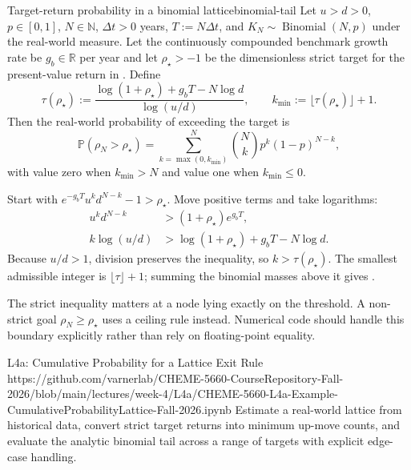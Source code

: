 \documentclass[11pt]{article}
\newcommand{\Pmeasure}{\mathbb{P}}
\begin{document}
\begin{theorem}{Target-return probability in a binomial lattice}{binomial-tail}
Let $u>d>0$, $p\in[0,1]$, $N\in\mathbb{N}$, $\Delta t>0$ years, $T:=N\Delta t$, and $K_N\sim\operatorname{Binomial}(N,p)$ under the real-world measure. Let the continuously compounded benchmark growth rate be $g_b\in\mathbb{R}$ per year and let $\rho_\star>-1$ be the dimensionless strict target for the present-value return in . Define
\begin{equation}
  \label{eq:count-threshold}
  \tau(\rho_\star):=
  \frac{\log(1+\rho_\star)+g_bT-N\log d}{\log(u/d)},
  \qquad
  k_{\min}:=\lfloor\tau(\rho_\star)\rfloor+1.
\end{equation}
Then the real-world probability of exceeding the target is
\begin{equation}
  \label{eq:binomial-tail}
  \Pmeasure(\rho_N>\rho_\star)
  =\sum_{k=\max(0,k_{\min})}^{N}
  \binom{N}{k}p^k(1-p)^{N-k},
\end{equation}
with value zero when $k_{\min}>N$ and value one when $k_{\min}\leq0$.
\end{theorem}

\begin{derivation}
Start with $e^{-g_bT}u^kd^{N-k}-1>\rho_\star$. Move positive terms and take logarithms:
\begin{align*}
  u^kd^{N-k}&>(1+\rho_\star)e^{g_bT},\\
  k\log(u/d)&>\log(1+\rho_\star)+g_bT-N\log d.
\end{align*}
Because $u/d>1$, division preserves the inequality, so $k>\tau(\rho_\star)$. The smallest admissible integer is $\lfloor\tau\rfloor+1$; summing the binomial masses above it gives .
\end{derivation}

The strict inequality matters at a node lying exactly on the threshold. A non-strict goal $\rho_N\geq\rho_\star$ uses a ceiling rule instead. Numerical code should handle this boundary explicitly rather than rely on floating-point equality.

\notebooklink
  {L4a: Cumulative Probability for a Lattice Exit Rule}
  {https://github.com/varnerlab/CHEME-5660-CourseRepository-Fall-2026/blob/main/lectures/week-4/L4a/CHEME-5660-L4a-Example-CumulativeProbabilityLattice-Fall-2026.ipynb}
  {Estimate a real-world lattice from historical data, convert strict target returns into minimum up-move counts, and evaluate the analytic binomial tail across a range of targets with explicit edge-case handling.}
\end{document}
